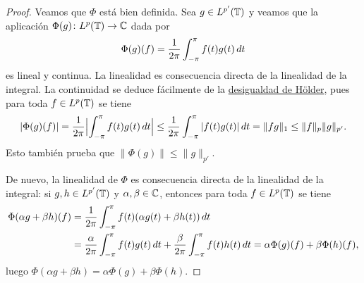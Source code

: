 \documentclass[a4paper, 12pt]{book}
\begin{document}
\begin{proof}
    Veamos que $\Phi$ está bien definida. Sea $g \in L^{p'}(\mathbb T)$ y veamos que la aplicación $\Phi(g)\colon L^p(\mathbb T)\to \mathbb C$ dada por
    \[\Phi(g)(f) = \frac{1}{2\pi}\int_{-\pi}^{\pi} f(t)g(t) \, dt\]
    es lineal y continua. La linealidad es consecuencia directa de la linealidad de la integral. La continuidad se deduce fácilmente de la \hyperref[1.1.1]{desigualdad de Hölder}, pues para toda $f \in L^p(\mathbb T)$ se tiene
    \[|\Phi(g)(f)| = \frac{1}{2\pi}\Bigl|\int_{-\pi}^{\pi} f(t)g(t) \, dt\Bigr| \leq \frac{1}{2\pi}\int_{-\pi}^{\pi} |f(t){g(t)}| \, dt = \|fg\|_1 \leq \|f\|_p\|g\|_{p'}.\]
    Esto también prueba que $\|\Phi(g)\| \leq \|g\|_{p'}$.
    
    De nuevo, la linealidad de $\Phi$ es consecuencia directa de la linealidad de la integral: si $g,h \in L^{p'}(\mathbb T)$ y $\alpha,\beta \in \mathbb C$, entonces para toda $f \in L^p(\mathbb T)$ se tiene
    \begin{align*}
        \Phi(\alpha g + \beta h)(f) &= \frac{1}{2\pi}\int_{-\pi}^{\pi} f(t)(\alpha g(t)+\beta h(t)) \, dt \\ &= \frac{\alpha}{2\pi}\int_{-\pi}^{\pi} f(t)g(t) \, dt+\frac{\beta}{2\pi}\int_{-\pi}^{\pi} f(t)h(t) \, dt = \alpha \Phi(g)(f)+\beta \Phi(h)(f),
    \end{align*}
    luego $\Phi(\alpha g + \beta h) = \alpha \Phi(g) + \beta \Phi(h)$.


\end{proof}
\end{document}
